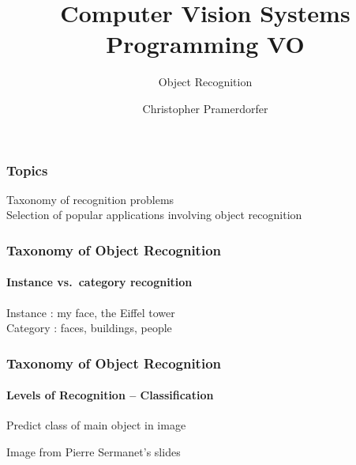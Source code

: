\documentclass[xetex,professionalfont]{beamer}
\title{Computer Vision Systems Programming VO}
\subtitle{Object Recognition}
\author{Christopher Pramerdorfer}
\institute{Computer Vision Lab, Vienna University of Technology}
\begin{document}

\begin{frame}
\maketitle
\end{frame}


\begin{frame}
\frametitle{Topics}

Taxonomy of recognition problems\\\medskip
Selection of popular applications involving object recognition

\end{frame}


\begin{frame}
\frametitle{Taxonomy of Object Recognition}
\framesubtitle{Instance vs.\ category recognition}

Instance : my face, the Eiffel tower\\\medskip
Category : faces, buildings, people

\end{frame}


\begin{frame}
\frametitle{Taxonomy of Object Recognition}
\framesubtitle{Levels of Recognition -- Classification}

Predict class of main object in image

\bigskip
\begin{center}
    {\centering Image from Pierre Sermanet's slides}
\end{center}

\end{frame}
\end{document}

